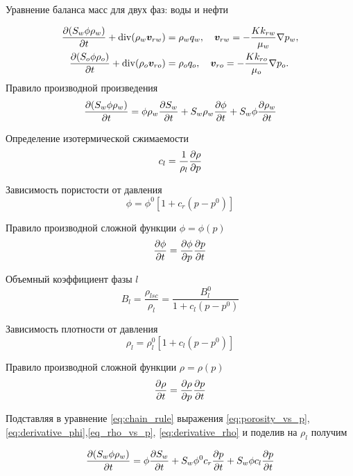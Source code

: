 



Уравнение баланса масс для двух фаз: воды и нефти

\begin{equation}\label{eq:common_equation_multiphase_rho}
\begin{split}
	\dfrac{\partial (S_w \phi \rho_w)}{\partial t} + \operatorname{div}(\rho_w \bm{v}_{rw})    &= \rho_w q_w, \quad \bm{v}_{rw}=-\frac{K k_{rw}}{\mu_w}\nabla p_w,\\
	\dfrac{\partial (S_o \phi \rho_o)}{\partial t} + \operatorname{div}(\rho_o \bm{v}_{ro})  &= \rho_o q_o, \quad \bm{v}_{ro}=-\frac{K k_{ro}}{\mu_o}\nabla p_o.
\end{split}
\end{equation}
Правило производной произведения
\begin{equation}\label{eq:chain_rule}
\dfrac{\partial (S_w \phi \rho_w)}{\partial t}=\phi \rho_w \dfrac{\partial S_w}{\partial t}+S_w \rho_w \dfrac{\partial \phi}{\partial t}+S_w \phi \dfrac{\partial \rho_w}{\partial t}
\end{equation}

Определение изотермической сжимаемости
\begin{equation}
c_l=\frac{1}{\rho_l}\dfrac{\partial \rho}{\partial p}
\end{equation}

Зависимость пористости от давления
\begin{equation}\label{eq:porosity_vs_p}
\phi = \phi^0 [1+c_r (p-p^0)]
\end{equation}

Правило производной сложной функции $\phi=\phi(p)$
\begin{equation}\label{eq:derivative_phi}
\dfrac{\partial \phi}{\partial t}=\dfrac{\partial \phi}{\partial p} \dfrac{\partial p}{\partial t}
\end{equation}

Объемный коэффициент фазы $l$
\begin{equation}\label{eq:FVF}
B_l=\frac{\rho_{lsc}}{\rho_l}=\frac{B^0_l}{1+c_l(p-p^0)}
\end{equation}

Зависимость плотности от давления
\begin{equation}\label{eq_rho_vs_p}
\rho_l=\rho^0_l[1+c_l(p-p^0)]
\end{equation}

Правило производной сложной функции $\rho=\rho(p)$
\begin{equation}\label{eq:derivative_rho}
\dfrac{\partial \rho}{\partial t}=\dfrac{\partial \rho}{\partial p} \dfrac{\partial p}{\partial t}
\end{equation}

Подставляя в уравнение \ref{eq:chain_rule} выражения \ref{eq:porosity_vs_p}, \ref{eq:derivative_phi},\ref{eq_rho_vs_p}, \ref{eq:derivative_rho} и 
поделив на $\rho_l$ получим

\begin{multline}\label{eq:ext_chain_rule}
\dfrac{\partial (S_w \phi \rho_w)}{\partial t}=\phi \dfrac{\partial S_w}{\partial t}+ S_w \phi^0 c_r \dfrac{\partial p}{\partial t}+ S_w \phi c_l \dfrac{\partial p}{\partial t}
\end{multline}


